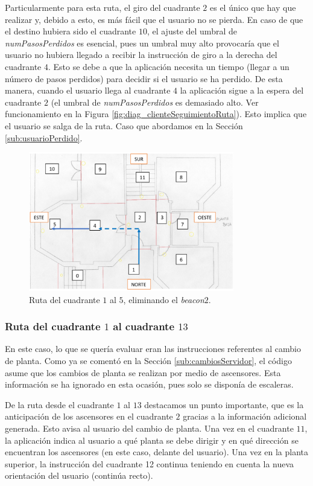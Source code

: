 Particularmente para esta ruta, el giro del cuadrante $2$ es el único que hay que realizar y, debido a esto, es más fácil que el usuario no se pierda. En caso de que el destino hubiera sido el cuadrante $10$, el ajuste del umbral de \textit{numPasosPerdidos} es esencial, pues un umbral muy alto provocaría que el usuario no hubiera llegado a recibir la instrucción de giro a la derecha del cuadrante $4$. Esto se debe a que la aplicación necesita un tiempo (llegar a un número de pasos perdidos) para decidir si el usuario se ha perdido. De esta manera, cuando el usuario llega al cuadrante $4$ la aplicación sigue a la espera del cuadrante $2$ (el umbral de \textit{numPasosPerdidos} es demasiado alto. Ver funcionamiento en la Figura \ref{fig:diag_clienteSeguimientoRuta}). Esto implica que el usuario se salga de la ruta. Caso que abordamos en la Sección \ref{sub:usuarioPerdido}.


\begin{figure}[t]
	\centering
	\includegraphics[width=0.8\textwidth]{Imagenes/Evaluacion/del1al5sin2}
	\caption{Ruta del cuadrante $1$ al $5$, eliminando el \textit{beacon$2$}.}
	\label{fig:del1al5sin2}
\end{figure}

\subsubsection{Ruta del cuadrante $1$ al cuadrante $13$}

En este caso, lo que se quería evaluar eran las instrucciones referentes al cambio de planta. Como ya se comentó en la Sección \ref{sub:cambiosServidor}, el código asume que los cambios de planta se realizan por medio de ascensores. Esta información se ha ignorado en esta ocasión, pues solo se disponía de escaleras. 

De la ruta desde el cuadrante $1$ al $13$ destacamos un punto importante, que es la anticipación de los ascensores en el cuadrante $2$ gracias a la información adicional generada. Esto avisa al usuario del cambio de planta. Una vez en el cuadrante $11$, la aplicación indica al usuario a qué planta se debe dirigir y en qué dirección se encuentran los ascensores (en este caso, delante del usuario). Una vez en la planta superior, la instrucción del cuadrante 12 continua teniendo en cuenta la nueva orientación del usuario (continúa recto). 

